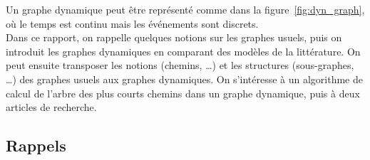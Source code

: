 \documentclass[12pt,a4paper]{article}
\begin{document}
Un graphe dynamique peut être représenté comme dans la
figure~\ref{fig:dyn_graph}, où le temps est continu mais les
événements sont discrets.\\

Dans ce rapport, on rappelle quelques notions sur les graphes usuels,
puis on introduit les graphes dynamiques en comparant des modèles de
la littérature. On peut ensuite transposer les notions (chemins, …)
et les structures (sous-graphes, …) des graphes usuels aux graphes
dynamiques. On s'intéresse à un algorithme de calcul de l'arbre des
plus courts chemins dans un graphe dynamique, puis à deux articles de
recherche.

\subsection{Rappels}
\end{document}

